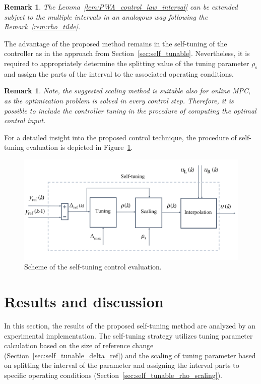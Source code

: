 \documentclass[preprint,12pt]{elsarticle}
\newtheorem{remark}[theorem]{Remark}
\begin{document}
	\begin{remark}
		The Lemma~\ref{lem:PWA_control_law_interval} can be extended subject to the multiple intervals in an analogous way following the Remark~\ref{rem:rho_tilde}.
	\end{remark}
	
	The advantage of the proposed method remains in the self-tuning of the controller as in the approach from Section~\ref{sec:self_tunable}. Nevertheless, it is required to appropriately determine the splitting value of the tuning parameter $\rho_{\mathrm{s}}$ and assign the parts of the interval to the associated operating conditions.
	
	\begin{remark}
		Note, the suggested scaling method is suitable also for online MPC, as the optimization problem is solved in every control step. Therefore, it is possible to include the controller tuning in the procedure of computing the optimal control input.   
	\end{remark}
	
	For a detailed insight into the proposed control technique, the procedure of self-tuning evaluation is depicted in Figure~\ref{fig:tuning}.
	
	\begin{figure}
		\begin{center}
			\includegraphics[width=\textwidth]{images/tuning}
			\caption[Self-tuning scheme]{Scheme of the self-tuning control evaluation.}
			\label{fig:tuning}
		\end{center}
	\end{figure}
	
	
	\section{Results and discussion}
	\label{sec:results}
	
	In this section, the results of the proposed self-tuning method are analyzed by an experimental implementation. The self-tuning strategy utilizes tuning parameter calculation based on the size of reference change (Section~\ref{sec:self_tunable_delta_ref}) and the scaling of tuning parameter based on splitting the interval of the parameter and assigning the interval parts to specific operating conditions (Section~\ref{sec:self_tunable_rho_scaling}).
	
\end{document}
